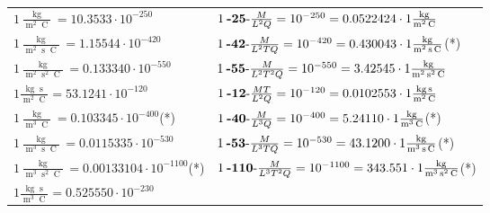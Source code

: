 \begin{center}
\begin{longtable}{l l}
{\color{black}$1 \bm{\mathrm{ }}\frac{\operatorname{kg}}{\operatorname{m}^2\operatorname{C}} = 10.3533\cdot10^{-250} $}&
	{\color{black}$1\:\text{\textbf{-25}-} \frac{M}{L^2Q}=10^{-250} = 0.0522424 \cdot 1 \bm{\mathrm{ }}\frac{\operatorname{kg}}{\operatorname{m}^2\operatorname{C}}$}\\
{\color{black}$1 \bm{\mathrm{ }}\frac{\operatorname{kg}}{\operatorname{m}^2\operatorname{s}\operatorname{C}} = 1.15544\cdot10^{-420} $}&
	{\color{black}$1\:\text{\textbf{-42}-} \frac{M}{L^2TQ}=10^{-420} = 0.430043 \cdot 1 \bm{\mathrm{ }}\frac{\operatorname{kg}}{\operatorname{m}^2\operatorname{s}\operatorname{C}}$}\quad(*)\\
{\color{black}$1 \bm{\mathrm{ }}\frac{\operatorname{kg}}{\operatorname{m}^2\operatorname{s}^2\operatorname{C}} = 0.133340\cdot10^{-550} $}&
	{\color{black}$1\:\text{\textbf{-55}-} \frac{M}{L^2T^2Q}=10^{-550} = 3.42545 \cdot 1 \bm{\mathrm{ }}\frac{\operatorname{kg}}{\operatorname{m}^2\operatorname{s}^2\operatorname{C}}$}\\
{\color{black}$1 \bm{\mathrm{ }}\frac{\operatorname{kg}\operatorname{s}}{\operatorname{m}^2\operatorname{C}} = 53.1241\cdot10^{-120} $}&
	{\color{black}$1\:\text{\textbf{-12}-} \frac{MT}{L^2Q}=10^{-120} = 0.0102553 \cdot 1 \bm{\mathrm{ }}\frac{\operatorname{kg}\operatorname{s}}{\operatorname{m}^2\operatorname{C}}$}\\
{\color{black}$1 \bm{\mathrm{ }}\frac{\operatorname{kg}}{\operatorname{m}^3\operatorname{C}} = 0.103345\cdot10^{-400} $}\quad(*)&
	{\color{black}$1\:\text{\textbf{-40}-} \frac{M}{L^3Q}=10^{-400} = 5.24110 \cdot 1 \bm{\mathrm{ }}\frac{\operatorname{kg}}{\operatorname{m}^3\operatorname{C}}$}\quad(*)\\
{\color{black}$1 \bm{\mathrm{ }}\frac{\operatorname{kg}}{\operatorname{m}^3\operatorname{s}\operatorname{C}} = 0.0115335\cdot10^{-530} $}&
	{\color{black}$1\:\text{\textbf{-53}-} \frac{M}{L^3TQ}=10^{-530} = 43.1200 \cdot 1 \bm{\mathrm{ }}\frac{\operatorname{kg}}{\operatorname{m}^3\operatorname{s}\operatorname{C}}$}\quad(*)\\
{\color{black}$1 \bm{\mathrm{ }}\frac{\operatorname{kg}}{\operatorname{m}^3\operatorname{s}^2\operatorname{C}} = 0.00133104\cdot10^{-1100} $}\quad(*)&
	{\color{black}$1\:\text{\textbf{-110}-} \frac{M}{L^3T^2Q}=10^{-1100} = 343.551 \cdot 1 \bm{\mathrm{ }}\frac{\operatorname{kg}}{\operatorname{m}^3\operatorname{s}^2\operatorname{C}}$}\quad(*)\\
{\color{black}$1 \bm{\mathrm{ }}\frac{\operatorname{kg}\operatorname{s}}{\operatorname{m}^3\operatorname{C}} = 0.525550\cdot10^{-230} $}&

\end{longtable}
\end{center}
